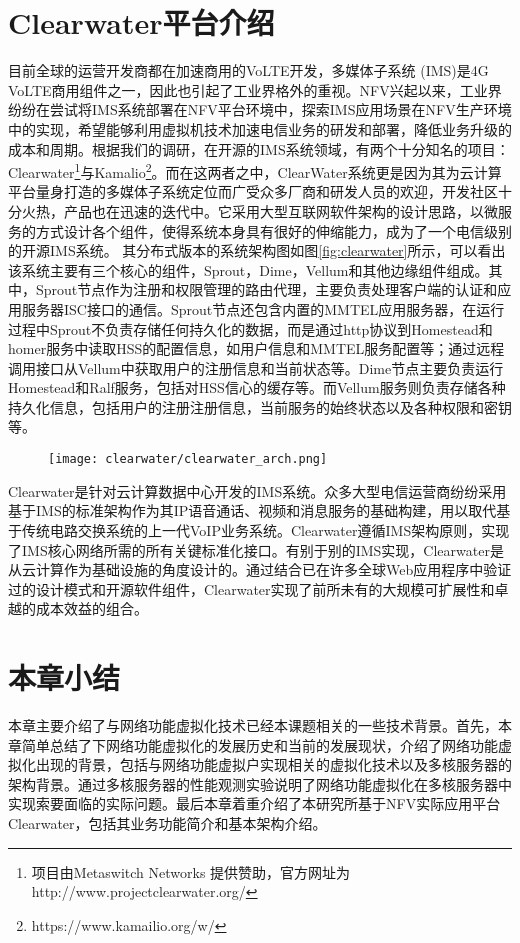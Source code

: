\section{Clearwater平台介绍}
\label{intro:clearwater}
目前全球的运营开发商都在加速商用的VoLTE开发，多媒体子系统 (IMS)是4G VoLTE商用组件之一，因此也引起了工业界格外的重视。NFV兴起以来，工业界纷纷在尝试将IMS系统部署在NFV平台环境中，探索IMS应用场景在NFV生产环境中的实现，希望能够利用虚拟机技术加速电信业务的研发和部署，降低业务升级的成本和周期。根据我们的调研，在开源的IMS系统领域，有两个十分知名的项目：Clearwater\footnote{项目由Metaswitch Networks 提供赞助，官方网址为 http://www.projectclearwater.org/ }与Kamalio\footnote{https://www.kamailio.org/w/}。而在这两者之中，ClearWater系统更是因为其为云计算平台量身打造的多媒体子系统定位而广受众多厂商和研发人员的欢迎，开发社区十分火热，产品也在迅速的迭代中。它采用大型互联网软件架构的设计思路，以微服务的方式设计各个组件，使得系统本身具有很好的伸缩能力，成为了一个电信级别的开源IMS系统。
其分布式版本的系统架构图如图\ref{fig:clearwater}所示，可以看出该系统主要有三个核心的组件，Sprout，Dime，Vellum和其他边缘组件组成。其中，Sprout节点作为注册和权限管理的路由代理，主要负责处理客户端的认证和应用服务器ISC接口的通信。Sprout节点还包含内置的MMTEL应用服务器，在运行过程中Sprout不负责存储任何持久化的数据，而是通过http协议到Homestead和homer服务中读取HSS的配置信息，如用户信息和MMTEL服务配置等；通过远程调用接口从Vellum中获取用户的注册信息和当前状态等。Dime节点主要负责运行Homestead和Ralf服务，包括对HSS信心的缓存等。而Vellum服务则负责存储各种持久化信息，包括用户的注册注册信息，当前服务的始终状态以及各种权限和密钥等。
\begin{figure}[!htp]
	\centering
	\texttt{[image: clearwater/clearwater\_arch.png]}
\end{figure}
Clearwater是针对云计算数据中心开发的IMS系统。众多大型电信运营商纷纷采用基于IMS的标准架构作为其IP语音通话、视频和消息服务的基础构建，用以取代基于传统电路交换系统的上一代VoIP业务系统。Clearwater遵循IMS架构原则，实现了IMS核心网络所需的所有关键标准化接口。有别于别的IMS实现，Clearwater是从云计算作为基础设施的角度设计的。通过结合已在许多全球Web应用程序中验证过的设计模式和开源软件组件，Clearwater实现了前所未有的大规模可扩展性和卓越的成本效益的组合。

\section{本章小结}
本章主要介绍了与网络功能虚拟化技术已经本课题相关的一些技术背景。首先，本章简单总结了下网络功能虚拟化的发展历史和当前的发展现状，介绍了网络功能虚拟化出现的背景，包括与网络功能虚拟户实现相关的虚拟化技术以及多核服务器的架构背景。通过多核服务器的性能观测实验说明了网络功能虚拟化在多核服务器中实现索要面临的实际问题。最后本章着重介绍了本研究所基于NFV实际应用平台Clearwater，包括其业务功能简介和基本架构介绍。